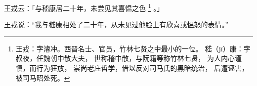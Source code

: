 
\switchcolumn*[\section{}]

王戎云：「与嵇康居二十年，未尝见其喜愠之色%
\footnote{%
    王戎：字濬冲。西晋名士、官员，竹林七贤之中最小的一位。
    嵇（jī）康：字叔夜，任魏朝中散大夫，
                世称稽中散，与阮籍等称竹林七贤，
                为人内心谨慎，而行为狂放，
                崇尚老庄哲学，借以反对司马氏的黑暗统治，
                后遭诬害，被司马昭处死。
}%
。」

\switchcolumn


王戎说：“我与嵇康相处了二十年，从未见过他脸上有欣喜或愠怒的表情。”
